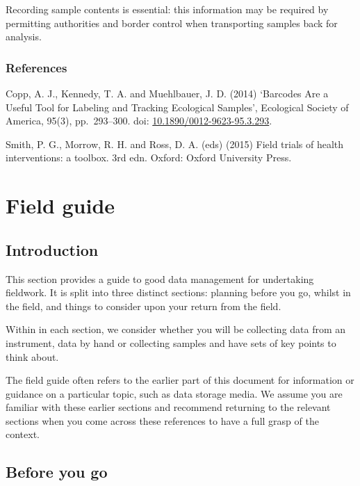 \documentclass[12pt,a4paper,oneside]{report}
\begin{document}
Recording sample contents is essential: this information may be required
by permitting authorities and border control when transporting samples
back for analysis.

\hypertarget{references-6}{%
\section{References}\label{references-6}}

Copp, A. J., Kennedy, T. A. and Muehlbauer, J. D. (2014) `Barcodes Are a
Useful Tool for Labeling and Tracking Ecological Samples', Ecological
Society of America, 95(3), pp.~293--300. doi:
\href{https://doi.org/10.1890/0012-9623-95.3.293}{10.1890/0012-9623-95.3.293}.

Smith, P. G., Morrow, R. H. and Ross, D. A. (eds) (2015) Field trials of
health interventions: a toolbox. 3rd edn. Oxford: Oxford University
Press.

\hypertarget{field-guide}{%
\part{Field guide}\label{field-guide}}

\hypertarget{introduction-1}{%
\chapter{Introduction}\label{introduction-1}}

This section provides a guide to good data management for undertaking
fieldwork. It is split into three distinct sections: planning before you
go, whilst in the field, and things to consider upon your return from
the field.

Within in each section, we consider whether you will be collecting data
from an instrument, data by hand or collecting samples and have sets of
key points to think about.

The field guide often refers to the earlier part of this document for
information or guidance on a particular topic, such as data storage
media. We assume you are familiar with these earlier sections and
recommend returning to the relevant sections when you come across these
references to have a full grasp of the context.

\hypertarget{before-you-go}{%
\chapter{Before you go}\label{before-you-go}}
\end{document}
